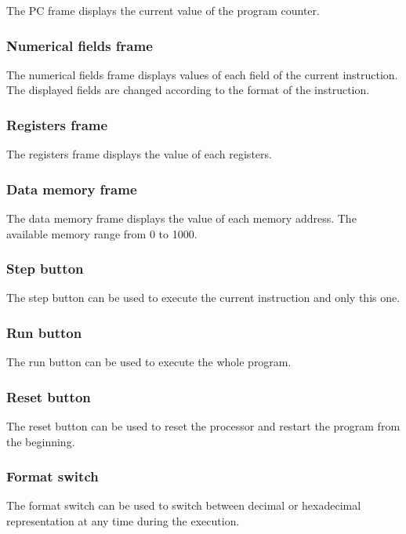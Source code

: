 		The PC frame displays the current value of the program counter.
		
	\subsubsection{Numerical fields frame}
	
		The numerical fields frame displays values of each field of the current instruction. The displayed fields are changed according to the format of the instruction.
		
	\subsubsection{Registers frame}
	
		The registers frame displays the value of each registers.
	
	\subsubsection{Data memory frame}
	
		The data memory frame displays the value of each memory address. The available memory range from 0 to 1000. 
		
	\subsubsection{Step button}
	
		The step button can be used to execute the current instruction and only this one.
	
	\subsubsection{Run button}
	
		The run button can be used to execute the whole program.
		
	\subsubsection{Reset button}
	
		The reset button can be used to reset the processor and restart the program from the beginning.
		
	\subsubsection{Format switch}
	
		The format switch can be used to switch between decimal or hexadecimal representation at any time during the execution.